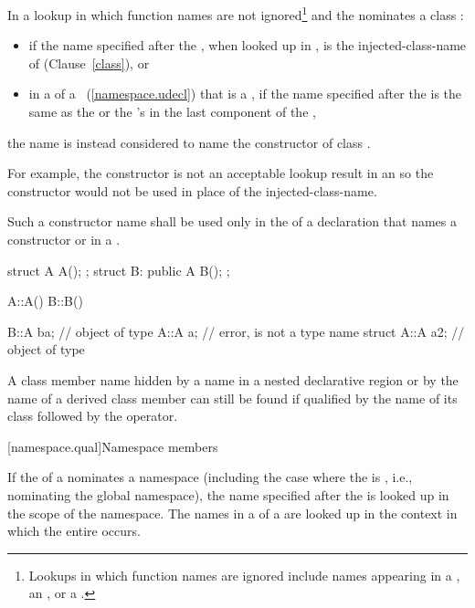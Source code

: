 \pnum
In a lookup in which function names are not ignored\footnote{Lookups in which
function names are ignored include names appearing in a
, an
, or a .}
and the  nominates a class :
\begin{itemize}
\item if the name specified after the ,
when looked up in , is the injected-class-name of  (Clause~\ref{class}), or
\item
in a  of
a ~(\ref{namespace.udecl}) that is a ,
if the name specified after the  is the same as the
 or the 's
 in the last component of the ,
\end{itemize}
the name is instead considered to name the
constructor of class . \begin{note} For example, the constructor
is not an acceptable lookup result in an
 so the constructor would not be
used in place of the injected-class-name. \end{note} Such a constructor
name shall be used only in the  of a declaration
that names a constructor or in a .
\begin{example}
\begin{codeblock}
struct A { A(); };
struct B: public A { B(); };

A::A() { }
B::B() { }

B::A ba;            // object of type 
A::A a;             // error,  is not a type name
struct A::A a2;     // object of type 
\end{codeblock}
\end{example}

\pnum
A class member name hidden by a name in a nested declarative region or
by the name of a derived class member can still be found if qualified by
the name of its class followed by the \tcode{::} operator.

[namespace.qual]{Namespace members}

\pnum
{}%
If the  of a 
nominates a namespace (including the case where the
 is \tcode{::}, i.e., nominating
the global namespace), the name specified after the
 is looked up in the scope of the
namespace.
The names in a  of a
 are looked up in the context in which the
entire  occurs.


